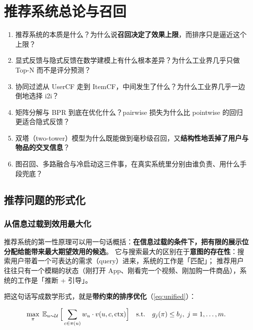 \chapter{推荐系统总论与召回}
\label{ch:recall}

\begin{insight}[本章要解决的问题]
\begin{enumerate}
  \item 推荐系统的本质是什么？为什么说\textbf{召回决定了效果上限}，而排序只是逼近这个上限？
  \item 显式反馈与隐式反馈在数学建模上有什么根本差异？为什么工业界几乎只做 Top-N 而不是评分预测？
  \item 协同过滤从 UserCF 走到 ItemCF，中间发生了什么？为什么工业界几乎一边倒地选择 i2i？
  \item 矩阵分解与 BPR 到底在优化什么？pairwise 损失为什么比 pointwise 的回归更适合隐式反馈？
  \item 双塔（two-tower）模型为什么既能做到毫秒级召回，又\textbf{结构性地丢掉了用户与物品的交叉信息}？
  \item 图召回、多路融合与冷启动这三件事，在真实系统里分别由谁负责、用什么手段兜底？
\end{enumerate}
\end{insight}

\section{推荐问题的形式化}

\subsection{从信息过载到效用最大化}

推荐系统的第一性原理可以用一句话概括：\textbf{在信息过载的条件下，把有限的展示位分配给能带来最大期望效用的候选}。
它与搜索最大的区别在于\textbf{意图的存在性}：搜索用户带着一个可表达的需求（query）进来，系统的工作是「匹配」；
推荐用户往往只有一个模糊的状态（刚打开 App、刚看完一个视频、刚加购一件商品），系统的工作是「推断 + 引导」。

把这句话写成数学形式，就是\textbf{带约束的排序优化}（\cref{eq:unified}）：

\begin{equation}
\max_{\pi} \; \operatorname{\mathbb{E}}_{u \sim \mathcal{U}} \Big[ \sum_{c \in \pi(u)} w_u \cdot v(u, c, \text{ctx}) \Big]
\quad \text{s.t.} \quad g_j(\pi) \le b_j, \; j = 1, \dots, m .
\label{eq:recall-objective}
\end{equation}

